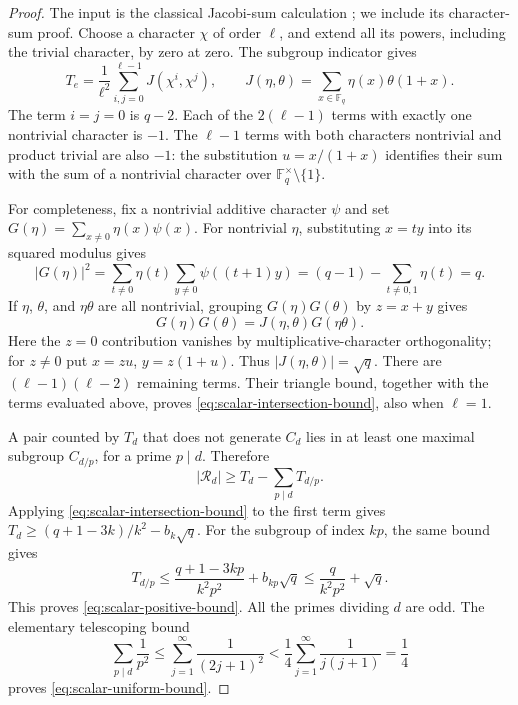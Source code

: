 \documentclass[11pt]{article}
\begin{document}
\begin{proof}
The input is the classical Jacobi-sum calculation
\cite[Theorems~1--2]{vW02}; we include its character-sum proof.
Choose a character $\chi$ of order $\ell$, and extend all its powers,
including the trivial character, by zero at zero. The subgroup indicator gives
\[
 T_e=\frac1{\ell^2}\sum_{i,j=0}^{\ell-1}J(\chi^i,\chi^j),
 \qquad J(\eta,\theta)=\sum_{x\in\mathbb F_q}\eta(x)\theta(1+x).
\]
The term $i=j=0$ is $q-2$. Each of the $2(\ell-1)$ terms with
exactly one nontrivial character is $-1$. The $\ell-1$ terms with
both characters nontrivial and product trivial are also $-1$:
the substitution $u=x/(1+x)$ identifies their sum with the sum of
a nontrivial character over $\mathbb F_q^\times\setminus\{1\}$.

For completeness, fix a nontrivial additive character $\psi$ and set
$G(\eta)=\sum_{x\ne0}\eta(x)\psi(x)$. For nontrivial $\eta$,
substituting $x=ty$ into its squared modulus gives
\[
 |G(\eta)|^2
 =\sum_{t\ne0}\eta(t)\sum_{y\ne0}\psi((t+1)y)
 =(q-1)-\sum_{t\ne0,1}\eta(t)=q.
\]
If $\eta$, $\theta$, and $\eta\theta$ are all nontrivial,
grouping $G(\eta)G(\theta)$ by $z=x+y$ gives
\[
 G(\eta)G(\theta)=J(\eta,\theta)G(\eta\theta).
\]
Here the $z=0$ contribution vanishes by multiplicative-character
orthogonality; for $z\ne0$ put $x=zu$, $y=z(1+u)$.
Thus $|J(\eta,\theta)|=\sqrt q$.
There are $(\ell-1)(\ell-2)$ remaining terms.
Their triangle bound, together with the terms evaluated above, proves
\eqref{eq:scalar-intersection-bound}, also when $\ell=1$.

A pair counted by $T_d$ that does not generate $C_d$ lies in at least
one maximal subgroup $C_{d/p}$, for a prime $p\mid d$. Therefore
\[
 |\mathcal R_d|\ge T_d-\sum_{p\mid d}T_{d/p}.
\]
Applying \eqref{eq:scalar-intersection-bound} to the first term gives
$T_d\ge(q+1-3k)/k^2-b_k\sqrt q$. For the subgroup of index $kp$,
the same bound gives
\[
 T_{d/p}\le\frac{q+1-3kp}{k^2p^2}+b_{kp}\sqrt q
 \le\frac{q}{k^2p^2}+\sqrt q.
\]
This proves \eqref{eq:scalar-positive-bound}.
All the primes dividing $d$ are odd. The elementary telescoping bound
\[
 \sum_{p\mid d}\frac1{p^2}
 \le\sum_{j=1}^\infty\frac1{(2j+1)^2}
 <\frac14\sum_{j=1}^\infty\frac1{j(j+1)}=\frac14
\]
proves \eqref{eq:scalar-uniform-bound}.
\end{proof}
\end{document}
